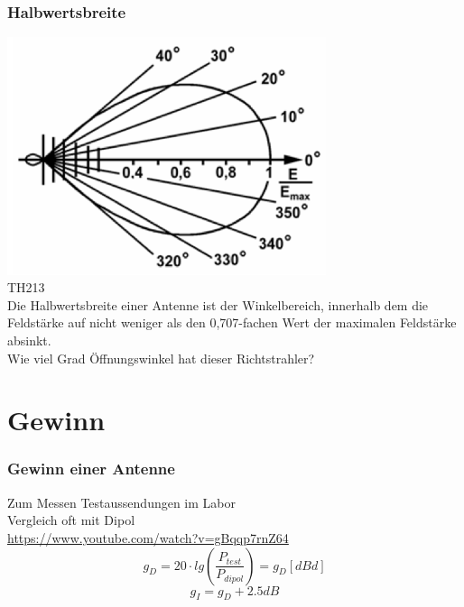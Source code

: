 \begin{frame}
  \frametitle{Halbwertsbreite}
  \begin{center}
    \includegraphics[width=0.7\textwidth]{a09/TH213.png}\\
    \tiny \hyperlink{refs}{\cite{bna}} TH213 \\[1em]
    \large Die Halbwertsbreite einer Antenne ist der Winkelbereich, innerhalb dem
    die Feldstärke auf nicht weniger als den 0,707-fachen Wert der maximalen Feldstärke absinkt.\\[1em] Wie viel Grad Öffnungswinkel hat dieser Richtstrahler?
  \end{center}
\end{frame}

\section*{Gewinn}

\begin{frame}
  \frametitle{Gewinn einer Antenne}
  \begin{center}
    \large Zum Messen Testaussendungen im Labor\\
    Vergleich oft mit Dipol\\
    \url{https://www.youtube.com/watch?v=gBqqp7rnZ64}\\[2em]
    $$g_D = 20 \cdot lg(\frac{P_{test}}{P_{dipol}}) = g_D[dBd]$$
    $$g_I = g_D + 2.5dB$$
  \end{center}
\end{frame}

